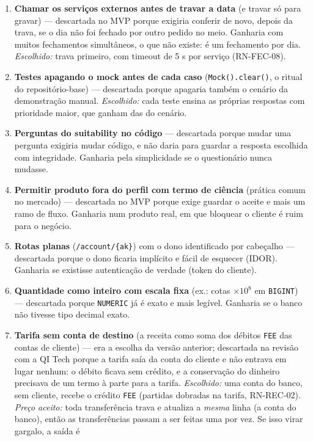 \documentclass[11pt,a4paper]{article}
\newcommand{\tb}[1]{\texttt{#1}}           %
\begin{document}
\begin{enumerate}
  (RN-PRO-06).
  \item \textbf{Chamar os serviços externos antes de travar a data} (e travar só para gravar) ---
  descartada no MVP porque exigiria conferir de novo, depois da trava, se o dia não foi fechado
  por outro pedido no meio. Ganharia com muitos fechamentos simultâneos, o que não existe: é um
  fechamento por dia. \emph{Escolhido:} trava primeiro, com timeout de 5 s por serviço
  (RN-FEC-08).
  \item \textbf{Testes apagando o mock antes de cada caso} (\tb{Mock().clear()}, o ritual do
  repositório-base) --- descartada porque apagaria também o cenário da demonstração manual.
  \emph{Escolhido:} cada teste ensina as próprias respostas com prioridade maior, que ganham das do
  cenário.
  \item \textbf{Perguntas do suitability no código} --- descartada porque mudar uma pergunta exigiria
  mudar código, e não daria para guardar a resposta escolhida com integridade. Ganharia pela
  simplicidade se o questionário nunca mudasse.
  \item \textbf{Permitir produto fora do perfil com termo de ciência} (prática comum no mercado) ---
  descartada no MVP porque exige guardar o aceite e mais um ramo de fluxo. Ganharia num produto
  real, em que bloquear o cliente é ruim para o negócio.
  \item \textbf{Rotas planas} (\tb{/account/\{ak\}}) com o dono identificado por cabeçalho ---
  descartada porque o dono ficaria implícito e fácil de esquecer (IDOR). Ganharia se existisse
  autenticação de verdade (token do cliente).
  \item \textbf{Quantidade como inteiro com escala fixa} (ex.: cotas $\times 10^8$ em \tb{BIGINT})
  --- descartada porque \tb{NUMERIC} já é exato e mais legível. Ganharia se o banco não tivesse
  tipo decimal exato.
  \item \textbf{Tarifa sem conta de destino} (a receita como soma dos débitos \tb{FEE} das contas
  de cliente) --- era a escolha da versão anterior; descartada na revisão com a QI Tech porque a
  tarifa saía da conta do cliente e não entrava em lugar nenhum: o débito ficava sem crédito, e a
  conservação do dinheiro precisava de um termo à parte para a tarifa. \emph{Escolhido:} uma conta
  do banco, sem cliente, recebe o crédito \tb{FEE} (partidas dobradas na tarifa, RN-REC-02).
  \emph{Preço aceito:} toda transferência trava e atualiza a \emph{mesma} linha (a conta do banco),
  então as transferências passam a ser feitas uma por vez. Se isso virar gargalo, a saída é

\end{enumerate}
\end{document}

